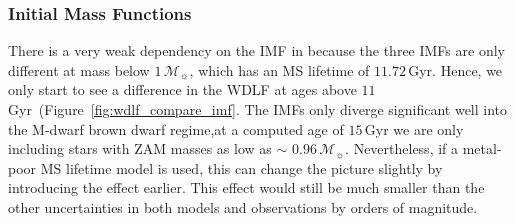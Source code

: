 \documentclass[fleqn,usenatbib]{rasti}
\newcommand{\msun}{\mathcal{M}_{\sun}}
\begin{document}
\subsubsection{Initial Mass Functions}
There is a very weak dependency on the IMF in because the three IMFs are only
different at mass below $1\,\msun$, which has an MS lifetime of $11.72$\,Gyr.
Hence, we only start to see a difference in the WDLF at ages above
$11$\,Gyr~(Figure~\ref{fig:wdlf_compare_imf}. The IMFs only diverge significant
well into the M-dwarf brown dwarf regime,at a computed age of $15$\,Gyr
we are only including stars with ZAM masses as low as $\sim$ $0.96\,\msun$.
Nevertheless, if a metal-poor MS lifetime model is used, this can change the
picture slightly by introducing the effect earlier. This effect would still
be much smaller than the other uncertainties in both models and observations
by orders of magnitude.
\end{document}
